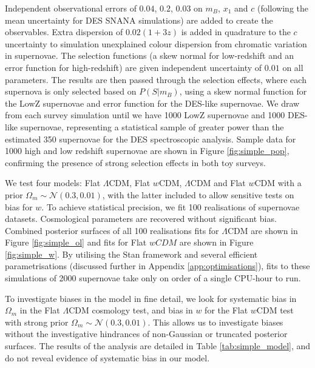 \documentclass[a4paper,fleqn,usenatbib]{mnras}
\begin{document}
Independent observational errors of $0.04$, $0.2$, $0.03$ on $m_B$, $x_1$ and $c$ (following the mean uncertainty for DES SNANA simulations) are added to create the observables. Extra dispersion of $0.02(1+3z)$ is added in quadrature to the $c$ uncertainty to simulation unexplained colour dispersion from chromatic variation in supernovae. The selection functions (a skew normal for low-redshift and an error function for high-redshift) are given independent uncertainty of $0.01$ on all parameters. The results are then passed through the selection effects, where each supernova is only selected based on $P(S|m_B)$, using a skew normal function for the LowZ supernovae and error function for the DES-like supernovae. We draw from each survey simulation until we have 1000 LowZ supernovae and 1000 DES-like supernovae, representing a statistical sample of greater power than the estimated 350 supernovae for the DES spectroscopic analysis. Sample data for 1000 high and low redshift supernovae are shown in Figure \ref{fig:simple_pop}, confirming the presence of strong selection effects in both toy surveys. 

We test four models: Flat $\Lambda$CDM, Flat $w$CDM, $\Lambda$CDM and Flat $w$CDM with a prior $\Omega_m \sim \mathcal{N}(0.3, 0.01)$, with the latter included to allow sensitive tests on bias for $w$. To achieve statistical precision, we fit 100 realisations of supernovae datasets. Cosmological parameters are recovered without significant bias. Combined posterior surfaces of all 100 realisations fits for $\Lambda$CDM are shown in Figure \ref{fig:simple_ol} and fits for Flat $wCDM$ are shown in Figure \ref{fig:simple_w}. By utilising the Stan framework and several efficient parametrisations (discussed further in Appendix \ref{app:optimisations}), fits to these simulations of 2000 supernovae take only on order of a single CPU-hour to run.

To investigate biases in the model in fine detail, we look for systematic bias in $\Omega_m$ in the Flat $\Lambda$CDM cosmology test, and bias in $w$ for the Flat $w$CDM test with strong prior $\Omega_m \sim \mathcal{N}(0.3, 0.01)$. This allows us to investigate biases without the investigative hindrances of non-Gaussian or truncated posterior surfaces. The results of the analysis are detailed in Table \ref{tab:simple_model}, and do not reveal evidence of systematic bias in our model.
\end{document}
